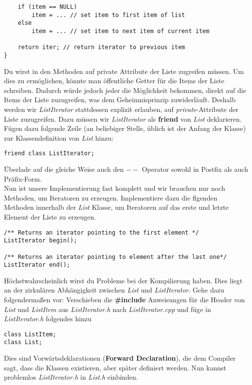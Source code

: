 \begin{enumerate}
\begin{lstlisting}
	if (item == NULL)
		item = ... // set item to first item of list
	else
		item = ... // set item to next item of current item
	
	return iter; // return iterator to previous item
}
\end{lstlisting} 

Du wirst in den Methoden auf private Attribute der Liste zugreifen müssen. Um dies zu ermöglichen, könnte man öffentliche Getter für die Items der Liste schreiben.
Dadurch würde jedoch jeder die Möglichkeit bekommen, direkt auf die Items der Liste zuzugreifen, was dem Geheimnisprinzip zuwiderläuft.
Deshalb werden wir \emph{ListIterator} stattdessen explizit erlauben, auf \emph{private}-Attribute der Liste zuzugreifen.
Dazu müssen wir \emph{ListIterator} als \textbf{friend} von \emph{List} deklarieren.
Fügen dazu folgende Zeile (an beliebiger Stelle, üblich ist der Anfang der Klasse) zur Klassendefinition von \emph{List} hinzu:
\begin{lstlisting}
friend class ListIterator;
\end{lstlisting}

Überlade auf die gleiche Weise auch den \textbf{$--$} Operator sowohl in Postfix als auch Präfix-Form. \\

Nun ist unsere Implementierung fast komplett und wir brauchen nur noch Methoden, um Iteratoren zu erzeugen.
Implementiere dazu die flgenden Methoden innerhalb der \emph{List} Klasse, um Iteratoren auf das erste und letzte Element der Liste zu erzeugen. 
\begin{lstlisting}
/** Returns an iterator pointing to the first element */
ListIterator begin();

/** Returns an iterator pointing to element after the last one*/
ListIterator end();
\end{lstlisting} 

Höchstwahrscheinlich wirst du Probleme bei der Kompilierung haben.
Dies liegt an der zirkulären Abhängigkeit zwischen \emph{List} und \emph{ListIterator}.
Gehe dazu folgendermaßen vor: 
Verschieben die \textbf{\#include} Anweisungen für die Header von \emph{List} und \emph{ListItem} aus \emph{ListIterator.h} nach \emph{ListIterator.cpp} und füge in \emph{ListIterator.h} folgendes hinzu

\begin{lstlisting}
class ListItem;
class List;
\end{lstlisting}

Dies sind Vorwärtsdeklarationen (\textbf{Forward Declaration}), die dem Compiler sagt, dass die Klassen existieren, aber später definiert werden. Nun kannst problemlos \emph{ListIterator.h} in \emph{List.h} einbinden. 


\end{enumerate}

